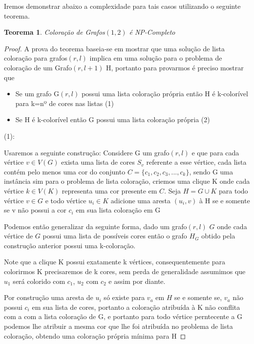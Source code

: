 \documentclass[a4paper,11pt]{article}
\newtheorem{teorema}{Teorema}
\begin{document}
Iremos demonstrar abaixo a complexidade para tais casos utilizando o seguinte teorema. 
    \begin{teorema}
      Coloração de Grafos$(1,2)$ é NP-Completo
    \end{teorema}
    \begin{proof}
      A prova do teorema baseia-se em mostrar que uma solução de lista coloração para grafos$(r,l)$ implica em uma solução para o problema de coloração de um Grafo$(r,l+1)$ H, portanto para provarmos é preciso mostrar que
      \begin{itemize}
        \item Se um grafo G$(r,l)$ possui uma lista coloração própria então H é k-colorível para k=nº de cores nas listas (1)
        \item Se H é k-colorível então G possui uma lista coloração própria (2)
      \end{itemize}
      (1):\newline
      
      Usaremos a seguinte construção:\newline
      Considere G um grafo$(r,l)$ e que para cada vértice $v \in V(G)$ exista uma lista de cores $S_v$ referente a esse vértice, cada lista contém pelo menos uma cor do conjunto $C = \{c_1,c_2,c_3,...,c_k \}$, sendo G uma instância sim para o problema de lista coloração, criemos uma clique K onde cada vértice $k \in V(K)$ representa uma cor presente em $C$. Seja $H = G \cup K$ para todo vértice $v \in G$ e todo vértice $u_i \in K$ adicione uma aresta $(u_i,v)$ à H se e somente se v não possui a cor $c_i$ em sua lista coloração em G
      
      Podemos então generalizar da seguinte forma, dado um grafo$(r,l)$ $G$ onde cada vértice de $G$ possui uma lista de possíveis cores então o grafo $H_G$ obtido pela construção anterior possui uma k-coloração.
      
      Note que a clique K possui exatamente k vértices, consequentemente para colorirmos K precisaremos de k cores, sem perda de generalidade assumimos que $u_1$ será colorido com $c_1$, $u_2$ com $c_2$ e assim por diante.
      
      Por construção uma aresta de $u_i$ só existe para $v_a$ em $H$ se e somente se, $v_a$ não possui $c_i$ em sua lista de cores, portanto a coloração atribuída à K não conflita com a com a lista coloração de G, e portanto para todo vértice perntecente a G podemos lhe atribuir a mesma cor que lhe foi atribuída no problema de lista coloração, obtendo uma coloração própria mínima para H
      

\end{proof}
\end{document}
